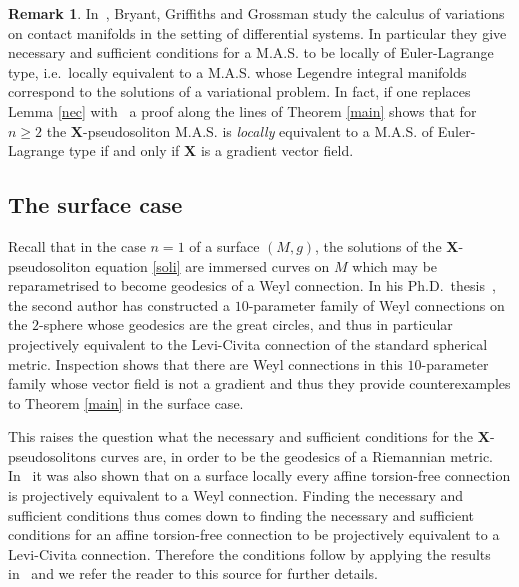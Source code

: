 \documentclass[11pt,letterpaper]{amsart}
\theoremstyle{definition}
\newtheorem*{remark}{Remark}
\numberwithin{equation}{section}
\begin{document}
\begin{remark}
In~\cite{MR1985469}, Bryant, Griffiths and Grossman study the calculus of variations on contact manifolds in the setting of differential systems. In particular they give necessary and sufficient conditions for a M.A.S. to be locally of Euler-Lagrange type, i.e.~locally equivalent to a M.A.S. whose Legendre integral manifolds correspond to the solutions of a variational problem. In fact, if one replaces Lemma \ref{nec} with~\cite[Theorem 1.2]{MR1985469} a proof along the lines of Theorem \ref{main} shows that for $n \geq 2$ the ${\mathbf{X}}$-pseudosoliton M.A.S. is \textit{locally} equivalent to a M.A.S. of Euler-Lagrange type if and only if ${\mathbf{X}}$ is a gradient vector field. 
\end{remark}

\subsection{The surface case}

Recall that in the case $n=1$ of a surface $(M,g)$, the solutions of the ${\mathbf{X}}$-pseudosoliton equation \eqref{soli} are immersed curves on $M$ which may be reparametrised to become geodesics of a Weyl connection. In his Ph.D.~thesis~\cite{mettlerphd}, the second author has constructed a $10$-parameter family of Weyl connections on the $2$-sphere whose geodesics are the great circles, and thus in particular projectively equivalent to the Levi-Civita connection of the standard spherical metric. Inspection shows that there are Weyl connections in this $10$-parameter family whose vector field is not a gradient and thus they provide counterexamples to Theorem \ref{main} in the surface case.

This raises the question what the necessary and sufficient conditions for the ${\mathbf{X}}$-pseudosolitons curves are, in order to be the geodesics of a Riemannian metric. In~\cite{mettlerphd} it was also shown that on a surface locally every affine torsion-free connection is projectively equivalent to a Weyl connection. Finding the necessary and sufficient conditions thus comes down to finding the necessary and sufficient conditions for an affine torsion-free connection to be projectively equivalent to a Levi-Civita connection. Therefore the conditions follow by applying the results in~\cite{MR2581355} and we refer the reader to this source for further details.       
\end{document}
